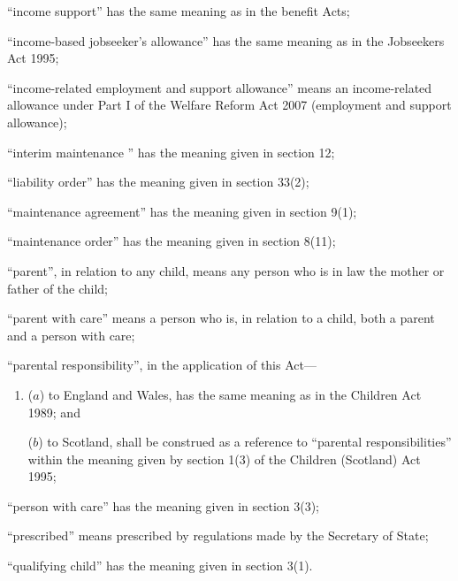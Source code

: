 \documentclass[a4paper]{article}
\begin{document}
\begin{enumerate}

“income support” has the same meaning as in the benefit Acts;

“income-based jobseeker’s allowance” has the same meaning as in the
Jobseekers Act 1995;

“income-related employment and support allowance” means an income-related
allowance under Part I of the Welfare Reform Act 2007 (employment and support
allowance);

“interim maintenance ” has the meaning given in section
12;

“liability order” has the meaning given in section 33(2);

“maintenance agreement” has the meaning given in section 9(1);



“maintenance order” has the meaning given in section 8(11);


“parent”, in relation to any child, means any person who is in law the mother
or father of the child;

“parent with care” means a person who is, in relation to a child, both a parent and
a person with care;

“parental responsibility”, in the application of this Act---
\begin{enumerate}\item[]
($a$) to England and Wales, has the same meaning as in the Children Act 1989; and

($b$) to Scotland, shall be construed as a reference to “parental responsibilities” within the meaning given by section 1(3) of the Children (Scotland) Act 1995;
\end{enumerate}


“person with care” has the meaning given in section 3(3);

“prescribed” means prescribed by regulations made by the Secretary of State;

“qualifying child” has the meaning given in section 3(1).
\end{enumerate}
\end{document}
